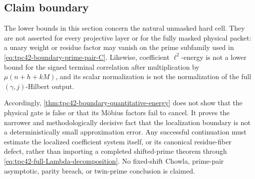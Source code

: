 \subsection{Claim boundary}

The lower bounds in this section concern the natural unmasked hard cell.
They are not asserted for every projective layer or for the fully masked
physical packet: a unary weight or residue factor may vanish on the prime
subfamily used in \eqref{eq:tpc42-boundary-prime-pair-C}.  Likewise,
coefficient \(\ell^2\)-energy is not a lower bound for the signed terminal
correlation after multiplication by \(\mu(n+h+kM)\), and its scalar
normalization is not the normalization of the full
\((\gamma,j)\)-Hilbert output.

Accordingly, \cref{thm:tpc42-boundary-quantitative-energy} does not show
that the physical gate is false or that its M\"obius factors fail to
cancel.  It proves the narrower and methodologically decisive fact that
the localization boundary is not a deterministically small approximation
error.  Any successful continuation must estimate the localized
coefficient system itself, or its canonical residue-fiber defect, rather
than importing a completed shifted-prime theorem through
\eqref{eq:tpc42-full-Lambda-decomposition}.  No fixed-shift Chowla,
prime-pair asymptotic, parity breach, or twin-prime conclusion is claimed.
